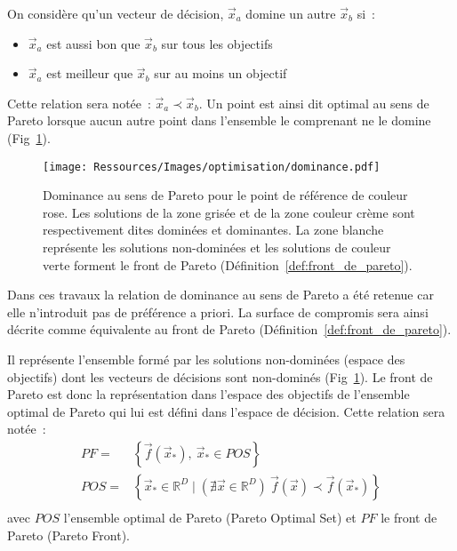 \begin{Def}\label{def:dominance_de_pareto}
On considère qu’un vecteur de décision, $\vec{x}_{a}$ domine un autre $\vec{x}_{b}$ si~:
\begin{itemize}
  \item $\vec{x}_{a}$ est aussi bon que $\vec{x}_{b}$ sur tous les objectifs
  \item $\vec{x}_{a}$ est meilleur que $\vec{x}_{b}$ sur au moins un objectif
\end{itemize}
Cette relation sera notée~: $\vec{x}_{a} \prec \vec{x}_{b}$.
Un point est ainsi dit optimal au sens de Pareto lorsque aucun autre point dans
l’ensemble le comprenant ne le domine (Fig~\ref{fig:dominance_pareto}).
\end{Def}

\begin{figure}
    \begin{center}
        \texttt{[image: Ressources/Images/optimisation/dominance.pdf]}
    \end{center}
    \caption{Dominance au sens de Pareto pour le point de référence de couleur rose.
             Les solutions de la zone grisée et de la zone couleur crème sont respectivement
             dites dominées et dominantes. La zone blanche représente les solutions
             non-dominées et les solutions de couleur verte forment le front de
             Pareto (Définition~\ref{def:front_de_pareto}).
             \label{fig:dominance_pareto}}
\end{figure}

Dans ces travaux la relation de dominance au sens de Pareto a été retenue car
elle n’introduit pas de préférence a priori. La surface de compromis sera ainsi
décrite comme équivalente au front de Pareto (Définition~\ref{def:front_de_pareto}).


\begin{Def}\label{def:front_de_pareto}
Il représente l’ensemble formé par les solutions non-dominées (espace des objectifs)
dont les vecteurs de décisions sont non-dominés (Fig~\ref{fig:dominance_pareto}).
Le front de Pareto est donc la représentation dans l’espace des objectifs
de l’ensemble optimal de Pareto qui lui est défini dans l’espace de décision.
Cette relation sera notée~:
\begin{equation}
  \begin{aligned}
    PF   =& \left\{ \vec{f}(\vec{x}_{*}), \  \vec{x}_{*} \in POS \right\} \\
    POS  =& \left\{ \vec{x}_{*} \in \mathbb{R}^{D} \mid (\nexists \vec{x} \in
            \mathbb{R}^{D}) \  \vec{f}(\vec{x}) \prec \vec{f}(\vec{x}_{*}) \right\} \\
  \end{aligned}
\end{equation}
avec $POS$ l’ensemble optimal de Pareto (Pareto Optimal Set) et $PF$ le front de
Pareto (Pareto Front).
\end{Def}


